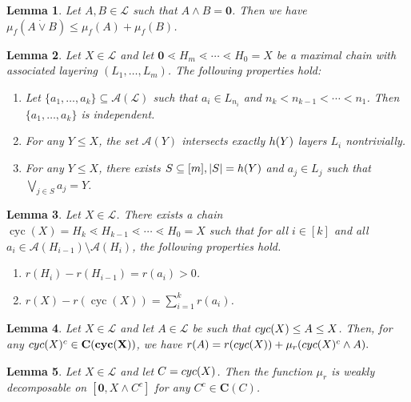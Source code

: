 \documentclass[10pt,a4paper]{amsart}
\newtheorem{lemma}{Lemma}
\newcommand{\cC}{\textup{\bf{C}}}
\DeclareMathOperator{\cyc}{cyc}
\newcommand{\h}{\textup{h}}
\newcommand{\mA}{\mathcal{A}}
\newcommand{\mL}{\mathcal{L}}
\newcommand{\zero}{{\mathbf{0}}}
\begin{document}
\begin{lemma}\label{lem:mu_submod}
    Let $A,B\in\mathcal{L}$ such that $A\wedge B=\zero$. Then we have $\mu_f(A\dot\vee B)\leq \mu_f(A)+\mu_f(B)$.
\end{lemma}

\begin{lemma}\label{lem:indep_layers_2_properties}
    Let $X\in\mathcal{L}$ and let $\zero\lessdot H_m\lessdot\cdots\lessdot H_0=X$ be a maximal chain with associated layering $(L_1,\dots,L_m)$. The following properties hold:
    \begin{enumerate}
        \item Let $\{a_1,\dots,a_k\}\subseteq\mathcal{A}(\mathcal{L})$ such that $a_i\in L_{n_i}$ and $n_k<n_{k-1}<\cdots<n_1$. Then $\{a_1,\dots,a_k\}$ is independent.
        \item For any $Y\leq X$, the set $\mA(Y)$ intersects exactly $\textup{h}(Y)$ layers $L_i$ nontrivially.
        \item For any $Y \leq X$, there exists $S \subseteq[m], |S|=\h(Y)$ and $a_j \in L_j$ such that $\bigvee_{j \in S} a_j = Y$.
    \end{enumerate}
\end{lemma}

\begin{lemma}\label{lem:max_chain_ranks}
    Let $X\in\mathcal{L}$. There exists a chain $\cyc(X)=H_k\lessdot H_{k-1}\lessdot\cdots\lessdot H_0=X$ such that for all $i\in[k]$ and all $a_i\in \mathcal{A}(H_{i-1})\setminus\mathcal{A}(H_i)$, the following properties hold. 
    \begin{enumerate}
        \item $r(H_i)-r(H_{i-1})=r(a_{i})>0$.
        \item $r(X)-r(\cyc(X))=\sum_{i=1}^kr(a_i)$.
    \end{enumerate}
\end{lemma}

\begin{lemma}\label{lem:cyc_rank_identity}
    Let $X \in \mL$ and let $A\in\mathcal{L}$ be such that $\textup{cyc}(X)\leq A\leq X$. Then, for any $\textup{cyc}(X)^c\in \cC(\textup{cyc}(X))$, we have
    \(
    r(A) = r(\textup{cyc}(X))+\mu_r(\textup{cyc}(X)^c\wedge A).
    \)
\end{lemma}

\begin{lemma}\label{lem:mu_is_q-mod_on_cf}
    Let $X \in \mathcal{L}$ and let $C = \textup{cyc}(X)$. 
    Then the function $\mu_r$ is weakly decomposable on $[\zero, X\wedge C^c]$ for any $C^c \in \mathbf{C}(C)$.
\end{lemma}
\end{document}
